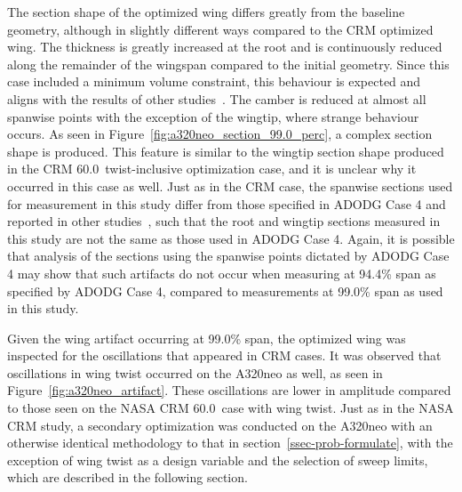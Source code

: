 The section shape of the optimized wing differs greatly from the baseline geometry, although in slightly different ways compared to the CRM optimized wing. The thickness is greatly increased at the root and is continuously reduced along the remainder of the wingspan compared to the initial geometry. Since this case included a minimum volume constraint, this behaviour is expected and aligns with the results of other studies~\cite{ledoux_study_2015, kenway_multipoint_2015, telidetzki_application_2014, lyu_rans-based_2014, lyu_aerodynamic_2015, osusky_drag_2015, shi-dong_approximate_2018, yu_influence_2018, koo_investigation_2018}. The camber is reduced at almost all spanwise points with the exception of the wingtip, where strange behaviour occurs. As seen in Figure~\ref{fig:a320neo_section_99.0_perc}, a complex section shape is produced. This feature is similar to the wingtip section shape produced in the CRM 60.0\degree\ twist-inclusive optimization case, and it is unclear why it occurred in this case as well.
Just as in the CRM case, the spanwise sections used for measurement in this study differ from those specified in ADODG Case 4 and reported in other studies~\cite{martins_aerodynamic_2022, koo_investigation_2018, shi-dong_adjoint-based_2017, lyu_aerodynamic_2015, kenway_multipoint_2015}, such that the root and wingtip sections measured in this study are not the same as those used in ADODG Case 4. Again, it is possible that analysis of the sections using the spanwise points dictated by ADODG Case 4 may show that such artifacts do not occur when measuring at 94.4\% span as specified by ADODG Case 4, compared to measurements at 99.0\% span as used in this study.

Given the wing artifact occurring at 99.0\% span, the optimized wing was inspected for the oscillations that appeared in CRM cases. It was observed that oscillations in wing twist occurred on the A320neo as well, as seen in Figure~\ref{fig:a320neo_artifact}. These oscillations are lower in amplitude compared to those seen on the NASA CRM 60.0\degree\ case with wing twist. Just as in the NASA CRM study, a secondary optimization was conducted on the A320neo with an otherwise identical methodology to that in section~\ref{ssec-prob-formulate}, with the exception of wing twist as a design variable and the selection of sweep limits, which are described in the following section.

